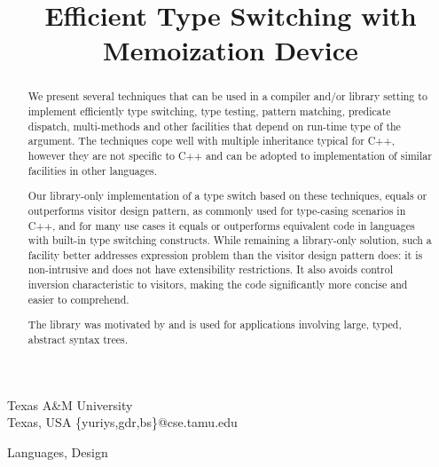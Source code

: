 \documentclass[preprint]{sigplanconf}
\makeatletter
\DeclareRobustCommand{\code}[1]{{\lstinline[breaklines=false,escapechar=@]{#1}}}
\makeatother
\begin{document}


\title{Efficient Type Switching with Memoization Device}

           {Texas A\&M University\\ Texas, USA}
           {\{yuriys,gdr,bs\}@cse.tamu.edu}

\maketitle

\begin{abstract}
We present several techniques that can be used in a compiler and/or library 
setting to implement efficiently type switching, type testing, pattern matching, 
predicate dispatch, multi-methods and other facilities that depend on run-time 
type of the argument. The techniques cope well with multiple inheritance typical 
for C++, however they are not specific to C++ and can be adopted to implementation 
of similar facilities in other languages.

Our library-only implementation of a type switch based on these techniques, equals 
or outperforms visitor design pattern, as commonly used for type-casing 
scenarios in C++, and for many use cases it equals or outperforms equivalent 
code in languages with built-in type switching constructs. While remaining a 
library-only solution, such a facility better addresses expression problem 
than the visitor design pattern does: it is non-intrusive and does not have 
extensibility restrictions. It also avoids control inversion characteristic to 
visitors, making the code significantly more concise and easier to comprehend.
 
The library was motivated by and is used for applications involving large, 
typed, abstract syntax trees.
\end{abstract}


\terms
Languages, Design
\end{document}
